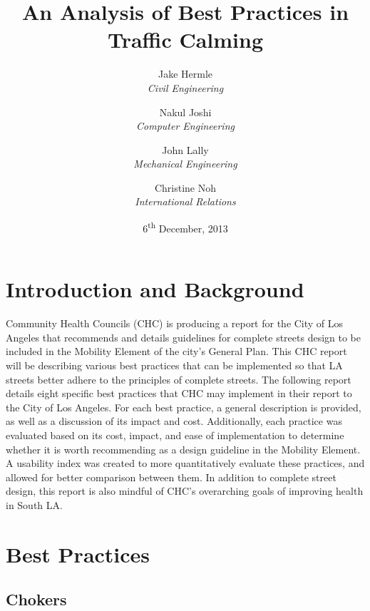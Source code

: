 \documentclass[titlepage,oneside]{article}
\title{An Analysis of Best Practices in Traffic Calming}
\author{
	Jake Hermle\\ \emph{Civil Engineering} \and
	Nakul Joshi\\ \emph{Computer Engineering} \and
	John Lally\\ \emph{Mechanical Engineering}\and
	Christine Noh\\ \emph{International Relations}
}
\date{6\textsuperscript{th} December, 2013}
\begin{document}
\listoftodos

\newpage
{}

\maketitle

\begin{abstract}

\end{abstract}


\tableofcontents
\newpage
\listoffigures
\newpage
\listoftables
\newpage



\section{Introduction and Background}

Community Health Councils (CHC) is producing a report for the City of Los Angeles that recommends and details guidelines for complete streets design to be included in the Mobility Element of the city’s General Plan. This CHC report will be describing various best practices that can be implemented so that LA streets better adhere to the principles of complete streets. The following report details eight specific best practices that CHC may implement in their report to the City of Los Angeles. For each best practice, a general description is provided, as well as a discussion of its impact and cost. Additionally, each practice was evaluated based on its cost, impact, and ease of implementation to determine whether it is worth recommending as a design guideline in the Mobility Element. A usability index was created to more quantitatively evaluate these practices, and allowed for better comparison between them. In addition to complete street design, this report is also mindful of CHC’s overarching goals of improving health in South LA.


\newpage

\section{Best Practices}

	\subsection{Chokers}
	
	
\end{document}

